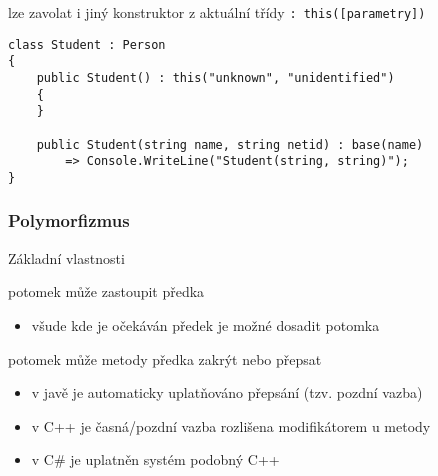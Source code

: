 \begin{frame}[fragile]
\begin{bitemize}{}
\item lze zavolat i jiný konstruktor z aktuální třídy \lstinline|: this([parametry])|
\end{bitemize}

\begin{yesblock}
\begin{lstlisting}[basicstyle=\small]
class Student : Person
{
    public Student() : this("unknown", "unidentified") 
    { 
    }

    public Student(string name, string netid) : base(name) 
        => Console.WriteLine("Student(string, string)");
}
\end{lstlisting}
\end{yesblock}
\end{frame}






\begin{frame}[fragile]
\frametitle{Polymorfizmus}

\begin{bitemize}{Základní vlastnosti}
\item potomek může zastoupit předka
\begin{itemize}
\item všude kde je očekáván předek je možné dosadit potomka
\end{itemize}

\item potomek může metody předka zakrýt nebo přepsat
\begin{itemize}
\item v javě je automaticky uplatňováno přepsání (tzv. pozdní vazba)
\item v C++ je časná/pozdní vazba rozlišena modifikátorem u metody
\item v C\# je uplatněn systém podobný C++
\end{itemize}

\end{bitemize}
\end{frame}



